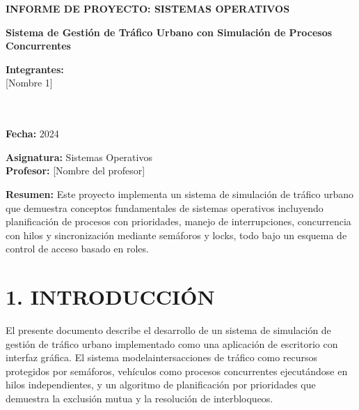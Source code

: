 \documentclass[12pt,a4paper]{article}
\begin{document}
\begin{titlepage}
    \centering
    \vspace*{2cm}
    
    {\LARGE\bfseries INFORME DE PROYECTO: SISTEMAS OPERATIVOS\par}
    \vspace{1.5cm}
    
    {\LARGE\bfseries Sistema de Gestión de Tráfico Urbano con Simulación de Procesos Concurrentes\par}
    \vspace{2cm}
    
    \large
    
    \textbf{Integrantes:}\\
    \vspace{0.3cm}
    [Nombre 1]\\
    [Nombre 2]\\
    [Nombre 3]\\
    \vspace{1.5cm}
    
    \textbf{Fecha:} 2024\\
    \vspace{1.5cm}
    
    \textbf{Asignatura:} Sistemas Operativos\\
    \textbf{Profesor:} [Nombre del profesor]\\
    
    \vspace{3cm}
    
    \textbf{Resumen:} Este proyecto implementa un sistema de simulación de tráfico urbano que demuestra conceptos fundamentales de sistemas operativos incluyendo planificación de procesos con prioridades, manejo de interrupciones, concurrencia con hilos y sincronización mediante semáforos y locks, todo bajo un esquema de control de acceso basado en roles.
    
    \vfill
\end{titlepage}

\newpage

\tableofcontents

\newpage

\section{1. INTRODUCCIÓN}

El presente documento describe el desarrollo de un sistema de simulación de gestión de tráfico urbano implementado como una aplicación de escritorio con interfaz gráfica. El sistema modelaintersacciones de tráfico como recursos protegidos por semáforos, vehículos como procesos concurrentes ejecutándose en hilos independientes, y un algoritmo de planificación por prioridades que demuestra la exclusión mutua y la resolución de interbloqueos.
\end{document}

